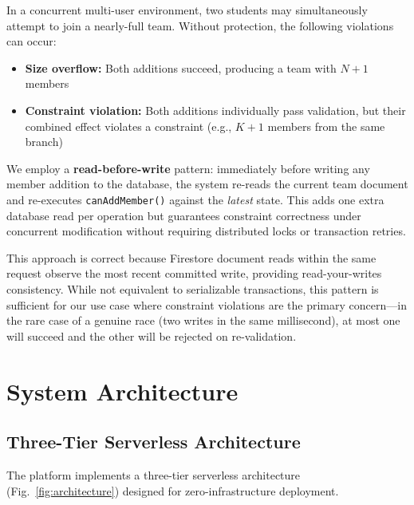 \documentclass[conference]{IEEEtran}
\begin{document}
In a concurrent multi-user environment, two students may simultaneously attempt to join a nearly-full team. Without protection, the following violations can occur:
\begin{itemize}[noitemsep,topsep=3pt]
    \item \textbf{Size overflow:} Both additions succeed, producing a team with $N+1$ members
    \item \textbf{Constraint violation:} Both additions individually pass validation, but their combined effect violates a constraint (e.g., $K+1$ members from the same branch)
\end{itemize}

We employ a \textbf{read-before-write} pattern: immediately before writing any member addition to the database, the system re-reads the current team document and re-executes \texttt{canAddMember()} against the \textit{latest} state. This adds one extra database read per operation but guarantees constraint correctness under concurrent modification without requiring distributed locks or transaction retries.

This approach is correct because Firestore document reads within the same request observe the most recent committed write, providing read-your-writes consistency. While not equivalent to serializable transactions, this pattern is sufficient for our use case where constraint violations are the primary concern---in the rare case of a genuine race (two writes in the same millisecond), at most one will succeed and the other will be rejected on re-validation.

\section{System Architecture}
\label{sec:architecture}

\subsection{Three-Tier Serverless Architecture}

The platform implements a three-tier serverless architecture (Fig.~\ref{fig:architecture}) designed for zero-infrastructure deployment.
\end{document}
